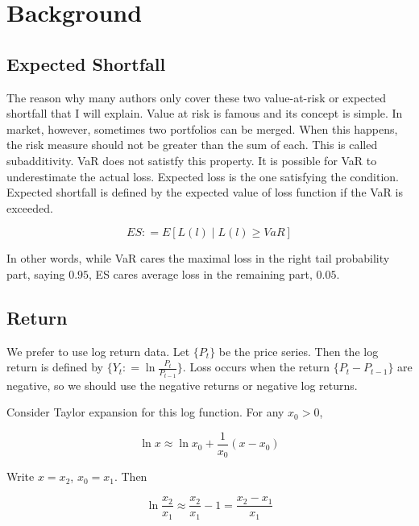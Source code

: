 \documentclass[
]{article}
\theoremstyle{definition}
\theoremstyle{definition}
\theoremstyle{definition}
\theoremstyle{remark}
\begin{document}
\hypertarget{background}{%
\section{Background}\label{background}}

\hypertarget{expected-shortfall}{%
\subsection{Expected Shortfall}\label{expected-shortfall}}

The reason why many authors only cover these two value-at-risk or expected shortfall that I will explain. Value at risk is famous and its concept is simple. In market, however, sometimes two portfolios can be merged. When this happens, the risk measure should not be greater than the sum of each. This is called subadditivity. VaR does not satistfy this property. It is possible for VaR to underestimate the actual loss. Expected loss is the one satisfying the condition. Expected shortfall is defined by the expected value of loss function if the VaR is exceeded.

\begin{equation}
  ES \mathpunct{:}=E \left[ L(l) \mid L(l) \ge VaR \right]
  \label{eq:esdef}
\end{equation}

In other words, while VaR cares the maximal loss in the right tail probability part, saying \(0.95\), ES cares average loss in the remaining part, \(0.05\).

\hypertarget{return}{%
\subsection{Return}\label{return}}

We prefer to use log return data. Let \(\{ P_t \}\) be the price series. Then the log return is defined by \(\{ Y_t \mathpunct{:}=\ln \frac{P_t}{P_{t - 1}} \}\). Loss occurs when the return \(\{ P_t - P_{t - 1} \}\) are negative, so we should use the negative returns or negative log returns.

Consider Taylor expansion for this log function. For any \(x_0 > 0\),

\begin{equation}
  \ln x \approx \ln x_0 + \frac{1}{x_0}(x - x_0)
\end{equation}

Write \(x = x_2\), \(x_0 = x_1\). Then

\begin{equation}
  \ln \frac{x_2}{x_1} \approx \frac{x_2}{x_1} - 1 = \frac{x_2 - x_1}{x_1}
  \label{eq:logpercent}
\end{equation}
\end{document}
